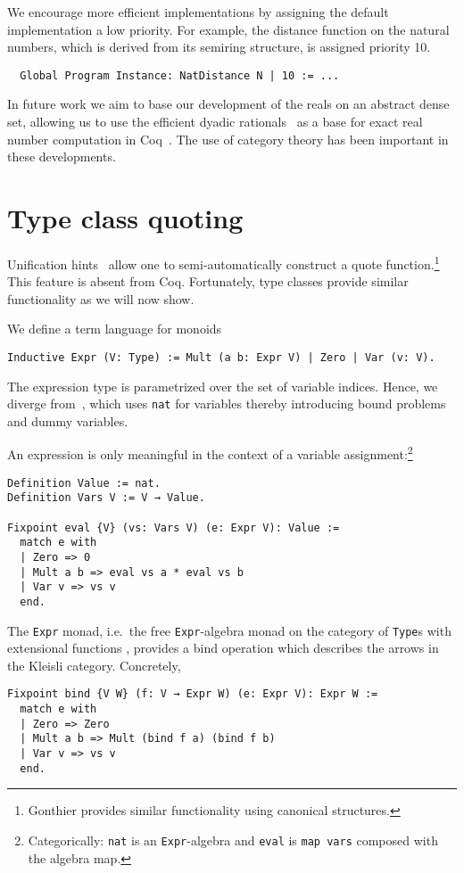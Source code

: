 \documentclass[a4paper,10pt,runningheads]{llncs}
\begin{document}
We encourage more efficient implementations by assigning the default implementation a
low priority. For example, the distance function on the natural numbers, which is derived from its
semiring structure, is assigned priority 10.
\begin{lstlisting}
  Global Program Instance: NatDistance N | 10 := ...
\end{lstlisting}

In future work we aim to base our development of the reals
on an abstract dense set, allowing us to use the efficient dyadic
rationals~\cite{boldo2009combining} as a base for exact real number computation in
Coq~\cite{Riemann,Oconnor:real}. The use of category theory has been important in these developments.

\section{Type class quoting}\label{quote}
Unification hints~\cite{Hints} allow one to semi-automatically construct a quote
function.\footnote{Gonthier provides similar functionality using canonical structures.} This feature is absent from Coq. Fortunately, type classes provide similar functionality as we will now show.

We define a term language for monoids
\begin{lstlisting}
Inductive Expr (V: Type) := Mult (a b: Expr V) | Zero | Var (v: V).
\end{lstlisting}

The expression type is parametrized over the set of variable indices. Hence, we diverge from~\cite{Hints}, 
which uses \lstinline|nat| for variables thereby introducing bound problems and dummy variables.

 An expression is only meaningful in the context of a variable
assignment:\footnote{Categorically: \lstinline|nat| is
an \lstinline|Expr|-algebra and \lstinline|eval| is \lstinline|map vars| composed with the algebra map.}
\begin{lstlisting}
Definition Value := nat.
Definition Vars V := V → Value.

Fixpoint eval {V} (vs: Vars V) (e: Expr V): Value :=
  match e with
  | Zero => 0
  | Mult a b => eval vs a * eval vs b
  | Var v => vs v
  end.
\end{lstlisting}

The \lstinline|Expr| monad, i.e.\ the free \lstinline|Expr|-algebra monad on the category of \lstinline|Type|s with extensional functions%
, provides a bind operation which describes the arrows in the Kleisli category. Concretely,
\begin{lstlisting}
Fixpoint bind {V W} (f: V → Expr W) (e: Expr V): Expr W :=
  match e with
  | Zero => Zero
  | Mult a b => Mult (bind f a) (bind f b)
  | Var v => vs v
  end.
\end{lstlisting}
\end{document}

